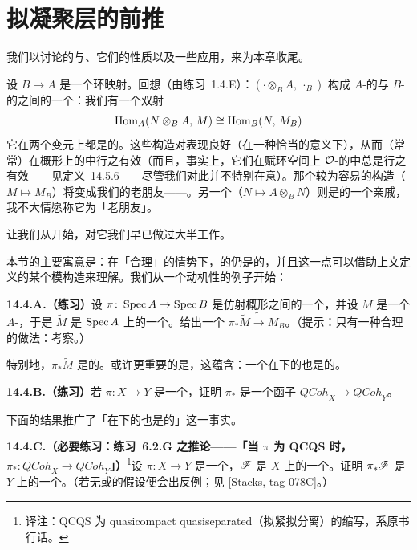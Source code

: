
\section{拟凝聚层的前推}

我们以讨论\trQCSheaf{}的\trPushforward{}与\trPullback、它们的性质以及一些应用，来为本章收尾。

设 $B\to A$ 是一个环映射。回想（由\mbox{练习~1.4.E}）：$\left(\cdot\otimes_B A,\ \cdot_B\right)$ 构成 $A$-\trModule{}的\trCategory{}与 $B$-\trModule{}的\trCategory{}之间的一个\trAdjointPair：我们有一个双射
\[
\operatorname{Hom}_A(N\otimes_B A,\,M)\cong\operatorname{Hom}_B(N,\,M_B)
\]
它在两个变元上都是\trFunctoriality{}的。这些构造对\trLocalization{}表现良好（在一种恰当的意义下），从而（常常）在概形上\trQCSheaf{}的\trCategory{}中行之有效（而且，事实上，它们在赋环空间上 $\mathcal{O}$-\trModule{}的\trCategory{}中总是行之有效——见定义~14.5.6——尽管我们对此并不特别在意）。那个较为容易的构造（$M\mapsto M_B$）将变成我们的老朋友——\trPushforward。另一个（$N\mapsto A\otimes_B N$）则是\trPullback{}的一个亲戚，我不大情愿称它为「老朋友」。

让我们从\trPushforward{}开始，对它我们早已做过大半工作。

本节的主要寓意是：在「合理」的情势下，\trQCSheaf{}的\trPushforward{}仍是\trQC{}的，并且这一点可以借助上文定义的某个模构造来理解。我们从一个动机性的例子开始：

\textbf{14.4.A.（练习）}\quad 设 $\pi\colon\operatorname{Spec} A\to\operatorname{Spec} B$ 是仿射概形之间的一个\trMorphism，并设 $M$ 是一个 $A$-\trModule，于是 $\widetilde{M}$ 是 $\operatorname{Spec} A$ 上的一个\trQCSheaf。给出一个\trIsomorphism{} $\pi_*\widetilde{M}\tilde{\longrightarrow}M_B$。（提示：只有一种合理的做法：考察\trDistinguishedOpen。）

特别地，$\pi_*\widetilde{M}$ 是\trQC{}的。或许更重要的是，这蕴含：一个\trQCSheaf{}在\trAffine\trMorphism{}下的\trPushforward{}也是\trQC{}的。

\textbf{14.4.B.（练习）}\quad 若 $\pi\colon X\to Y$ 是一个\trAffine\trMorphism，证明 $\pi_*$ 是一个\trExact{}函子 $\mathit{QCoh}_X\to\mathit{QCoh}_Y$。

下面的结果推广了「\trQCSheaf{}在\trAffine\trMorphism{}下的\trPushforward{}也是\trQC{}的」这一事实。

\textbf{14.4.C.（必要练习：\mbox{练习~6.2.G} 之推论——「当 $\pi$ 为 QCQS 时，$\pi_*\colon\mathit{QCoh}_X\to\mathit{QCoh}_Y$」）}\footnote{译注：QCQS 为 quasicompact quasiseparated（拟紧拟分离）的缩写，系原书行话。}\quad 设 $\pi\colon X\to Y$ 是一个\trQuasicompact\trQuasiSeparated\trMorphism，$\mathscr{F}$ 是 $X$ 上的一个\trQCSheaf。证明 $\pi_*\mathscr{F}$ 是 $Y$ 上的一个\trQCSheaf。（若无\trQuasicompact{}或\trQuasiSeparated{}的假设便会出反例；见 [Stacks, tag 078C]。）

